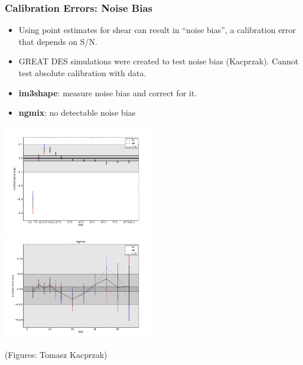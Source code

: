 \documentclass{beamer}
\newcommand{\ngmix}{{\bf ngmix}}
\newcommand{\imshape}{{\bf im3shape}}
\begin{document}
\frame
{
    \frametitle{Calibration Errors: Noise Bias}

    \begin{itemize}

        \item Using point estimates for shear can result in ``noise bias'', a
            calibration error that depends on S/N.

        \item GREAT DES simulations were created to test noise bias (Kacprzak).
            Cannot test absolute calibration with data.

        \item \imshape:  measure noise bias and correct for it.

        \item \ngmix: no detectable noise bias

    \end{itemize}

    \begin{center}
        \includegraphics[width=0.5\textwidth]{noise-bias-im3shape.png}
        \includegraphics[width=0.5\textwidth]{noise-bias-ngmix.png}
    \end{center}
    {\tiny (Figures: Tomasz Kacprzak)}
}
\end{document}
